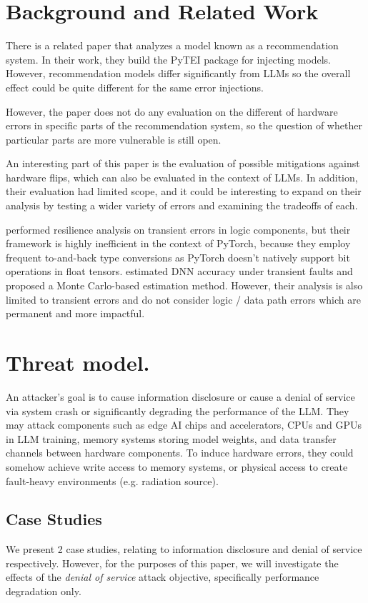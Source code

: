 \section{Background and Related Work}
\label{sec:relwork}
There is a related paper \cite{Ma23} that analyzes a model known as a recommendation system. In their work, they build the PyTEI package for injecting models. However, recommendation models differ significantly from LLMs so the overall effect could be quite different for the same error injections.

However, the paper does not do any evaluation on the different of hardware errors in specific parts of the recommendation system, so the question of whether particular parts are more vulnerable is still open.

An interesting part of this paper is the evaluation of possible mitigations against hardware flips, which can also be evaluated in the context of LLMs. In addition, their evaluation had limited scope, and it could be interesting to expand on their analysis by testing a wider variety of errors and examining the tradeoffs of each.

\cite{fidelity} performed resilience analysis on transient errors in logic components, but their framework is highly inefficient in the context of PyTorch, because they employ frequent to-and-back type conversions as PyTorch doesn't natively support bit operations in float tensors. \cite{thales} estimated DNN accuracy under transient faults and proposed a Monte Carlo-based estimation method. However, their analysis is also limited to transient errors and do not consider logic / data path errors which are permanent and more impactful.


\section{Threat model.}
An attacker's goal is to cause information disclosure or cause a denial of service via system crash or significantly degrading the performance of the LLM. They may attack components such as edge AI chips and accelerators, CPUs and GPUs in LLM training, memory systems storing model weights, and data transfer channels between hardware components. To induce hardware errors, they could somehow achieve write access to memory systems, or physical access to create fault-heavy environments (e.g. radiation source). 

\subsection{Case Studies}
We present 2 case studies, relating to information disclosure and denial of service respectively. However, for the purposes of this paper, we will investigate the effects of the \textit{denial of service} attack objective, specifically performance degradation only.

